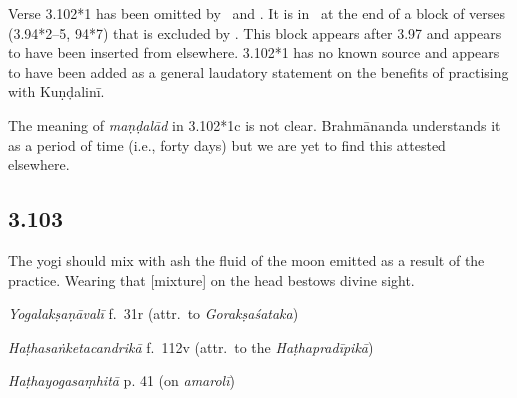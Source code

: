 \begin{ekdosis}
\begin{philcomm}[hp03_102_1]
Verse 3.102*1 has been omitted by \alphaOne\ and \alphaThree. It is in \alphaTwo\ at the end of a block of verses (3.94*2–5, 94*7) that is excluded by \alphaThree. This block appears after 3.97 and appears to have been inserted from elsewhere. 3.102*1 has no known source and appears to have been added as a general laudatory statement on the benefits of practising with Kuṇḍalinī.

The meaning of \emph{maṇḍalād} in 3.102*1c is not clear. Brahmānanda understands it as a period of time (i.e., forty days) but we are yet to find this attested elsewhere.
\end{philcomm}


\subsection*{3.103}
\begin{translation}[hp03_103]
The yogi should mix with ash the fluid of the moon emitted as a result of the practice. Wearing that [mixture] on the head bestows divine sight.
\end{translation}


\begin{testimonia}[hp03_103]
\emph{Yogalakṣaṇāvalī} f.~31r  (attr.~to \emph{Gorakṣaśataka})
\begin{versinnote}
\end{versinnote}

\emph{Haṭhasaṅketacandrikā} f.~112v (attr.~to the \emph{Haṭhapradīpikā})
\begin{versinnote}
\end{versinnote}

\emph{Haṭhayogasaṃhitā} p. 41 (on \emph{amarolī})
\begin{versinnote}
\end{versinnote}
\end{testimonia}


\end{ekdosis}
